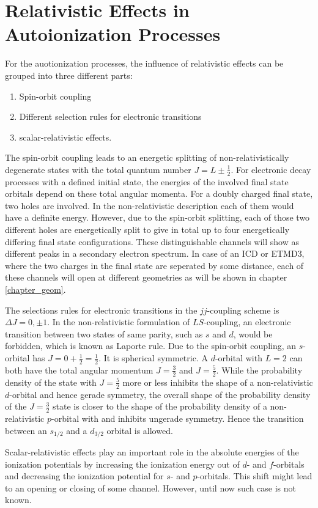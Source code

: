 \chapter{Relativistic Effects in Autoionization Processes}

For the auotionization processes, the influence of relativistic effects
can be grouped into three different parts:

\begin{enumerate}
  \item Spin-orbit coupling
  \item Different selection rules for electronic transitions
  \item scalar-relativistic effects.
\end{enumerate}

The spin-orbit coupling leads to an energetic splitting of non-relativistically
degenerate states with the total quantum number $J= L \pm \frac 12$.
For electronic decay processes with a defined initial state, the energies
of the involved final state orbitals depend on these total angular momenta.
For a doubly charged final state, two holes are involved. In the non-relativistic
description each of them would have a definite energy. However, due to the
spin-orbit splitting, each of those two different holes are energetically split
to give in total up to four energetically differing final state configurations.
These distinguishable channels will show as different peaks in a secondary electron
spectrum.
In case of an \ac{ICD} or \ac{ETMD}3, where the two charges in the final state are
seperated by some distance, each of these channels will open at different
geometries as will be shown in chapter \ref{chapter_geom}.

The selections rules for electronic transitions in the $jj$-coupling scheme
is $\Delta J = 0, \pm 1$. 
In the non-relativistic
formulation of $LS$-coupling, an electronic transition between two states
of same parity, such as $s$ and $d$, would be forbidden,
which is known as Laporte rule.
Due to the spin-orbit coupling, an $s$-orbital
has $J=0+\frac 12=\frac 12$. It is spherical symmetric. A $d$-orbital with
$L=2$ can both have the
total angular momentum $J=\frac 32$ and $J=\frac 52$. 
While the probability density of the state with $J=\frac 52$
more or less inhibits the shape of a
non-relativistic $d$-orbital and hence gerade symmetry, the overall
shape of the probability density of the $J=\frac 32$ state is closer to the
shape of the probability density of a non-relativistic $p$-orbital with
and inhibits ungerade symmetry. Hence the transition
between an $s_{1/2}$ and a $d_{3/2}$ orbital is allowed.

Scalar-relativistic effects play an important role in the absolute energies
of the ionization potentials by increasing the ionization energy out of
$d$- and $f$-orbitals and decreasing the ionization potential for $s$- and
$p$-orbitals. This shift might lead to an opening or closing of some channel.
However, until now such case is not known.



